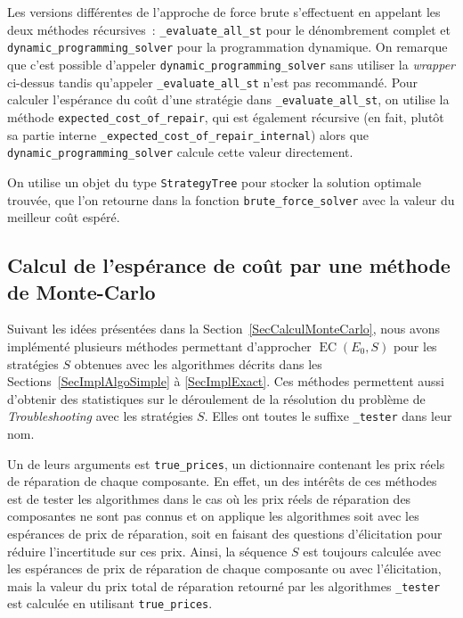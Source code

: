 \documentclass[a4paper,11pt]{article}
\theoremstyle{plain}
\theoremstyle{definition}
\DeclareMathOperator{\EC}{EC}
\begin{document}
Les versions différentes de l'approche de force brute s'effectuent en appelant les deux méthodes récursives~: \texttt{\_evaluate\_all\_st} pour le dénombrement complet et \texttt{dynamic\_programming\allowbreak{}\_solver} pour la programmation dynamique. On remarque que c'est possible d'appeler \texttt{dynamic\_programming\_solver} sans utiliser la \emph{wrapper} ci-dessus tandis qu'appeler \texttt{\_evaluate\_all\_st} n'est pas recommandé. Pour calculer l'espérance du coût d'une stratégie dans \texttt{\_evaluate\_all\_st}, on utilise la méthode \texttt{expected\_cost\_of\_repair}, qui est également récursive (en fait, plutôt sa partie interne \texttt{\_expected\_cost\_of\_repair\_internal}) alors que \texttt{dynamic\_programming\_solver} calcule cette valeur directement.

On utilise un objet du type \texttt{StrategyTree} pour stocker la solution optimale trouvée, que l'on retourne dans la fonction \texttt{brute\_force\_solver} avec la valeur du meilleur coût espéré.

\subsection{Calcul de l'espérance de coût par une méthode de Monte-Carlo}
\label{SecImplMC}

Suivant les idées présentées dans la Section~\ref{SecCalculMonteCarlo}, nous avons implémenté plusieurs méthodes permettant d'approcher $\EC(E_0, S)$ pour les stratégies $S$ obtenues avec les algorithmes décrits dans les Sections~\ref{SecImplAlgoSimple} à \ref{SecImplExact}. Ces méthodes permettent aussi d'obtenir des statistiques sur le déroulement de la résolution du problème de \emph{Troubleshooting} avec les stratégies $S$. Elles ont toutes le suffixe \texttt{\_tester} dans leur nom.

Un de leurs arguments est \texttt{true\_prices}, un dictionnaire contenant les prix réels de réparation de chaque composante. En effet, un des intérêts de ces méthodes est de tester les algorithmes dans le cas où les prix réels de réparation des composantes ne sont pas connus et on applique les algorithmes soit avec les espérances de prix de réparation, soit en faisant des questions d'élicitation pour réduire l'incertitude sur ces prix. Ainsi, la séquence $S$ est toujours calculée avec les espérances de prix de réparation de chaque composante ou avec l'élicitation, mais la valeur du prix total de réparation retourné par les algorithmes \texttt{\_tester} est calculée en utilisant \texttt{true\_prices}.
\end{document}
